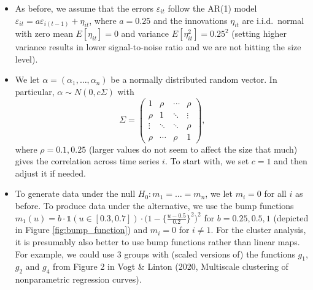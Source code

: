 \documentclass[a4paper,12pt]{article}
\begin{document}
\begin{enumerate}[label=\arabic*.,leftmargin=0.6cm]
{\begin{itemize}[topsep=0pt]
\begin{itemize}[label=--,leftmargin=0.45cm,itemsep=0pt]
\item As before, we assume that the errors $\varepsilon_{it}$ follow the AR(1) model $\varepsilon_{it} = a \varepsilon_{i(t-1)} + \eta_{it}$, where $a=0.25$ and the innovations $\eta_{it}$ are i.i.d.\ normal with zero mean $E[\eta_{it}]=0$ and variance $E[\eta_{it}^2]=0.25^2$ {\color{red}(setting higher variance results in lower signal-to-noise ratio and we are not hitting the size level)}. 

\item We let $\alpha = (\alpha_1,\ldots,\alpha_n)$ be a normally distributed random vector. In particular, $\alpha \sim N(0,c \Sigma)$ with
\[ \Sigma =
\begin{pmatrix}
1      & \rho   & \cdots & \rho   \\
\rho   & 1      & \ddots & \vdots \\
\vdots & \ddots & \ddots & \rho   \\
\rho   & \cdots & \rho   & 1
\end{pmatrix},
\]
where $\rho = 0.1, 0.25$ {\color{red}(larger values do not seem to affect the size that much)} gives the correlation across time series $i$. To start with, we set $c=1$ and then adjust it if needed.

\item To generate data under the null $H_0: m_1 = \ldots = m_n$, we let $m_i = 0$ for all $i$ as before. To produce data under the alternative, {\color{red}we use the bump functions $m_1(u) = b \cdot \mathbb{1}(u \in [0.3, 0.7]) \cdot \big(1 - \big\{\frac{u - 0.5}{0.2}\big\}^2\big)^2$ for $b = 0.25, 0.5, 1$ (depicted in Figure \ref{fig:bump_function}) and $m_i = 0$ for $i \neq 1$}. For the cluster analysis, it is presumably also better to use bump functions rather than linear maps. For example, we could use 3 groups with (scaled versions of) the functions $g_1$, $g_2$ and $g_4$ from Figure 2 in Vogt \& Linton (2020, Multiscale clustering of nonparametric regression curves).


\end{itemize}
\end{itemize}}
\end{enumerate}
\end{document}
